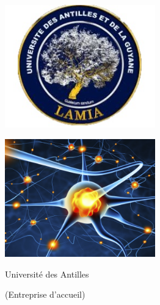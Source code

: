 \begin{titlepage}
    \enlargethispage{2cm}

    \begin{center}
        \vspace*{1cm}
        \includegraphics[width=6.5cm]{./images/lamialogo.jpg}
        \vspace*{0.5cm}

        \textsc{\@title}
        \HRule
        \vspace*{0.5cm}

        \large{\@author}
    \end{center}

    \begin{center}
      \vspace*{2cm}
      \includegraphics[width=6.5cm]{./images/n_a.jpg}
    \end{center}

    \vspace*{2cm}

    \begin{center}
        Université des Antilles

        (Entreprise d'accueil)
    \end{center}

\end{titlepage}
\ClearShipoutPicture
